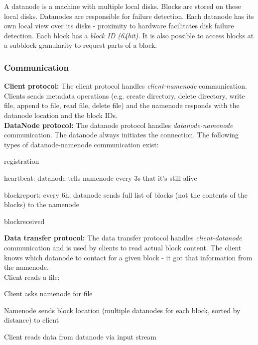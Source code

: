\documentclass[11pt,oneside,a4paper]{article}
\begin{document}
A datanode is a machine with multiple local disks. Blocks are stored on these local disks. Datanodes are responsible for failure detection. Each datanode has its own local view over its disks - proximity to hardware facilitates disk failure detection. Each block has a \textit{block ID (64bit)}. It is also possible to access blocks at a subblock granularity to request parts of a block.

\subsubsection{Communication}

\textbf{Client protocol:} The client protocol handles \textit{client-namenode} communication. Clients sends metadata operations (e.g. create directory, delete directory, write file, append to file, read file,
delete file) and the namenode responds with the datanode location and the block IDs.\\

\textbf{DataNode protocol:} The datanode protocol handles \textit{datanode-namenode} communication. The datanode always initiates the connection. The following types of datanode-namenode communication exist:

\begin{compactitem}
	\item registration
	\item heartbeat: datanode tells namenode every 3s that it's still alive
	\item blockreport: every 6h, datanode sends full list of blocks (not the contents of the blocks) to the namenode
	\item blockreceived\\
\end{compactitem}

\textbf{Data transfer protocol:} The data transfer protocol handles \textit{client-datanode} communication and is used by clients to read actual block content. The client knows which datanode to contact for a given block - it got that information from the namenode.\\
Client reads a file:

\begin{compactenum}
	\item Client asks namenode for file
	\item Namenode sends block location (multiple datanodes for each block, sorted by distance) to client
	\item Client reads data from datanode via input stream\\
\end{compactenum}
\end{document}
